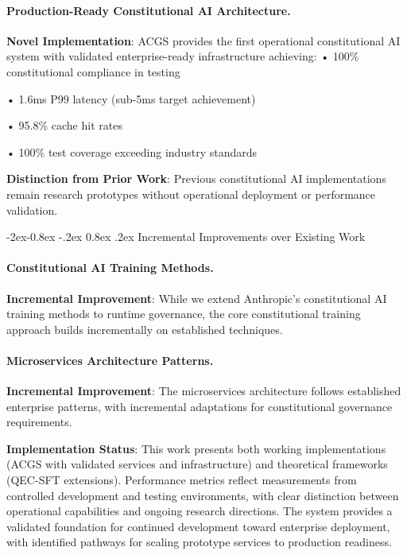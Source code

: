 \documentclass[manuscript,screen,9pt]{acmart}
\makeatletter
\renewcommand\subsubsection{\@startsection{subsubsection}{3}{\z@}%
  {-2ex\@plus -0.8ex \@minus -.2ex}%
  {0.8ex \@plus .2ex}%
  {\normalfont\normalsize\bfseries}}
\makeatother
\begin{document}
\paragraph{Production-Ready Constitutional AI Architecture.}
\textbf{Novel Implementation}: ACGS provides the first operational constitutional AI system with validated enterprise-ready infrastructure achieving:
\noindent• 100\% constitutional compliance in testing

\noindent• 1.6ms P99 latency (sub-5ms target achievement)

\noindent• 95.8\% cache hit rates

\noindent• 100\% test coverage exceeding industry standards

\textbf{Distinction from Prior Work}: Previous constitutional AI implementations remain research prototypes without operational deployment or performance validation.

\subsubsection{Incremental Improvements over Existing Work}
\label{subsubsec:incremental_improvements}

\paragraph{Constitutional AI Training Methods.}
\textbf{Incremental Improvement}: While we extend Anthropic's constitutional AI training methods to runtime governance, the core constitutional training approach builds incrementally on established techniques.

\paragraph{Microservices Architecture Patterns.}
\textbf{Incremental Improvement}: The microservices architecture follows established enterprise patterns, with incremental adaptations for constitutional governance requirements.

\textbf{Implementation Status}: This work presents both working implementations (ACGS with validated services and infrastructure) and theoretical frameworks (QEC-SFT extensions). Performance metrics reflect measurements from controlled development and testing environments, with clear distinction between operational capabilities and ongoing research directions. The system provides a validated foundation for continued development toward enterprise deployment, with identified pathways for scaling prototype services to production readiness.
\end{document}
